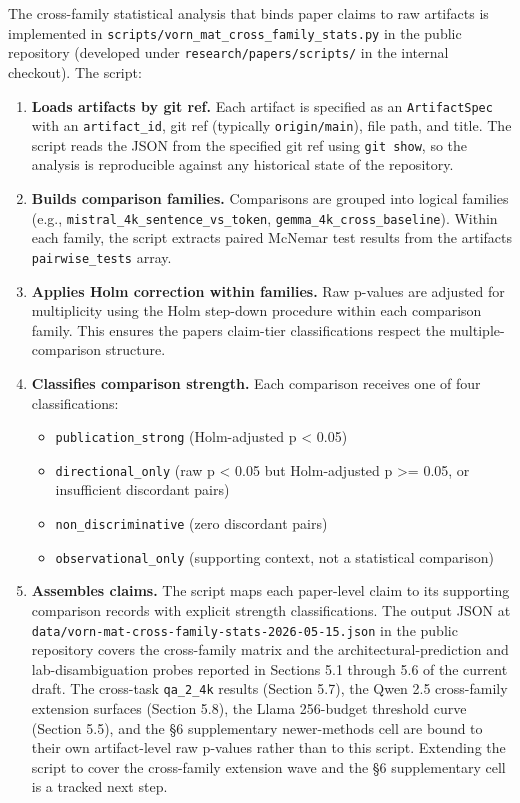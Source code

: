 \documentclass[
]{article}
\providecommand{\tightlist}{%
  \setlength{\itemsep}{0pt}\setlength{\parskip}{0pt}}
\begin{document}
The cross-family statistical analysis that binds paper claims to raw
artifacts is implemented in
\texttt{scripts/\allowbreak{}vorn\_mat\_cross\_family\_stats.\allowbreak{}py} in the public
repository (developed under \texttt{research/papers/scripts/} in the
internal checkout). The script:

\begin{enumerate}
\def\labelenumi{\arabic{enumi}.}
\item
  \textbf{Loads artifacts by git ref.} Each artifact is specified as an
  \texttt{ArtifactSpec} with an \texttt{artifact\_id}, git ref
  (typically \texttt{origin/main}), file path, and title. The script
  reads the JSON from the specified git ref using \texttt{git\ show}, so
  the analysis is reproducible against any historical state of the
  repository.
\item
  \textbf{Builds comparison families.} Comparisons are grouped into
  logical families (e.g., \texttt{mistral\_4k\_sentence\_vs\_token},
  \texttt{gemma\_4k\_cross\_baseline}). Within each family, the script
  extracts paired McNemar test results from the
  artifact\textquotesingle s \texttt{pairwise\_tests} array.
\item
  \textbf{Applies Holm correction within families.} Raw p-values are
  adjusted for multiplicity using the Holm step-down procedure within
  each comparison family. This ensures the paper\textquotesingle s
  claim-tier classifications respect the multiple-comparison structure.
\item
  \textbf{Classifies comparison strength.} Each comparison receives one
  of four classifications:

  \begin{itemize}
  \tightlist
  \item
    \texttt{publication\_strong} (Holm-adjusted p \textless{} 0.05)
  \item
    \texttt{directional\_only} (raw p \textless{} 0.05 but Holm-adjusted
    p \textgreater= 0.05, or insufficient discordant pairs)
  \item
    \texttt{non\_discriminative} (zero discordant pairs)
  \item
    \texttt{observational\_only} (supporting context, not a statistical
    comparison)
  \end{itemize}
\item
  \textbf{Assembles claims.} The script maps each paper-level claim to
  its supporting comparison records with explicit strength
  classifications. The output JSON at
  \texttt{data/\allowbreak{}vorn-mat-cross-family-stats-2026-05-15.\allowbreak{}json} in the
  public repository covers the cross-family matrix and the
  architectural-prediction and lab-disambiguation probes reported in
  Sections 5.1 through 5.6 of the current draft. The cross-task
  \texttt{qa\_2\_4k} results (Section 5.7), the Qwen 2.5 cross-family
  extension surfaces (Section 5.8), the Llama 256-budget threshold curve
  (Section 5.5), and the §6 supplementary newer-methods cell are bound
  to their own artifact-level raw p-values rather than to this script.
  Extending the script to cover the cross-family extension wave and the
  §6 supplementary cell is a tracked next step.
\end{enumerate}
\end{document}
